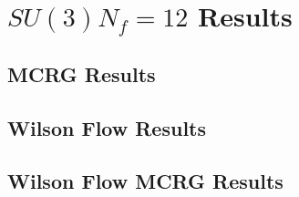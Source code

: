\chapter{$SU(3) N_f=12$ Results}
\label{ch:results}
  
  \section{MCRG Results}
  \label{sec:mcrg-results}
  

  \section{Wilson Flow Results}
  \label{sec:wflow-results}
  

  \section{Wilson Flow MCRG Results}
  \label{sec:wflow-mcrg-results}
  
